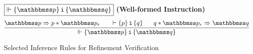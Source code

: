 \begin{figure*}
    \subfigure
    {
        \begin{minipage}{1\textwidth}
            $\boxed{\relwfins{\relastP}{\simplins{}}{\relastQ}}$
            \qquad
            \textbf{(Well-formed Instruction)}
            \[
                \infer
                {
                    \relwfins{\relastP}{\simplins{}}{\relastQ}
                }
                {
                    \relastP \Rightarrow 
                        \astP \sepstar \relastP_r 
                    \quad \ \ 
                    \wfins{\astP}{\simplins{}}{\astQ}
                    \quad \ \ 
                    \astQ \sepstar \relastP_r \Rightarrow 
                        \relastQ  
                }
            \]
        \end{minipage}
    }
    \caption{Selected Inference Rules for Refinement Verification}
    \label{fig:Selected Inference Rules for Refinement Verification}
\end{figure*}

